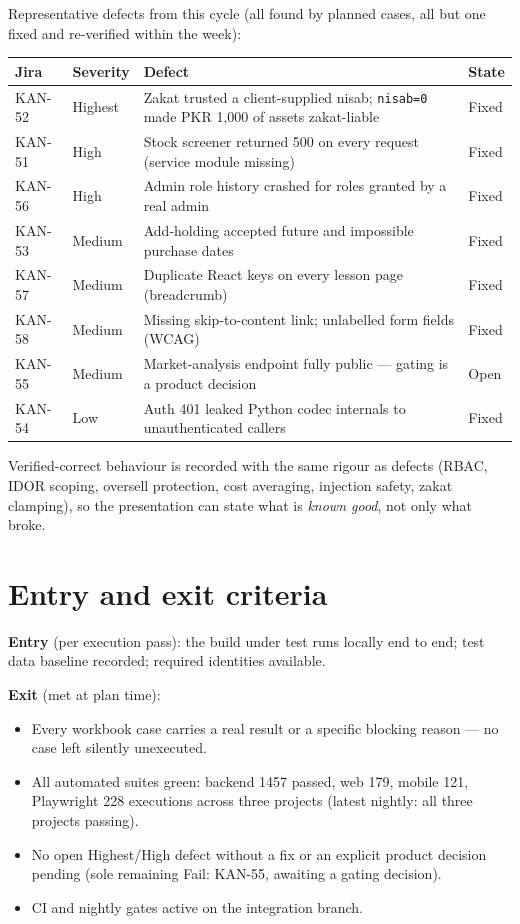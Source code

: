 \documentclass[11pt,a4paper]{article}
\begin{document}
Representative defects from this cycle (all found by planned cases, all but
one fixed and re-verified within the week):

\begin{center}
\small
\begin{tabularx}{\textwidth}{llLl}
\toprule
\textbf{Jira} & \textbf{Severity} & \textbf{Defect} & \textbf{State} \\
\midrule
KAN-52 & Highest & Zakat trusted a client-supplied nisab; \texttt{nisab=0} made PKR 1{,}000 of assets zakat-liable & Fixed \\
KAN-51 & High & Stock screener returned 500 on every request (service module missing) & Fixed \\
KAN-56 & High & Admin role history crashed for roles granted by a real admin & Fixed \\
KAN-53 & Medium & Add-holding accepted future and impossible purchase dates & Fixed \\
KAN-57 & Medium & Duplicate React keys on every lesson page (breadcrumb) & Fixed \\
KAN-58 & Medium & Missing skip-to-content link; unlabelled form fields (WCAG) & Fixed \\
KAN-55 & Medium & Market-analysis endpoint fully public --- gating is a product decision & Open \\
KAN-54 & Low & Auth 401 leaked Python codec internals to unauthenticated callers & Fixed \\
\bottomrule
\end{tabularx}
\end{center}

Verified-correct behaviour is recorded with the same rigour as defects (RBAC,
IDOR scoping, oversell protection, cost averaging, injection safety, zakat
clamping), so the presentation can state what is \emph{known good}, not only
what broke.

\section{Entry and exit criteria}

\textbf{Entry} (per execution pass): the build under test runs locally end to end;
test data baseline recorded; required identities available.

\textbf{Exit} (met at plan time):
\begin{itemize}
  \item Every workbook case carries a real result or a specific blocking reason
        --- no case left silently unexecuted.
  \item All automated suites green: backend 1457 passed, web 179, mobile 121,
        Playwright 228 executions across three projects (latest nightly:
        all three projects passing).
  \item No open Highest/High defect without a fix or an explicit product
        decision pending (sole remaining Fail: KAN-55, awaiting a gating
        decision).
  \item CI and nightly gates active on the integration branch.
\end{itemize}
\end{document}
